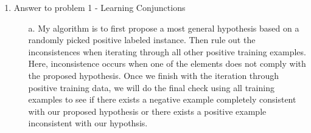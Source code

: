 

\oddsidemargin 0in
\evensidemargin 0in
\textwidth 6.5in
\topmargin -0.5in
\textheight 9.0in

\usepackage{csquotes}
\usepackage{amsmath}
\usepackage[colorlinks]{hyperref}
\usepackage{graphicx}
\graphicspath{{images/}}




\pagestyle{myheadings}  %

\begin{enumerate}
\item Answer to problem 1 - Learning Conjunctions

	\begin{enumerate}\parindent -4pt
	
	\item [a.]
	My algorithm is to first propose a most general hypothesis based on a randomly picked positive labeled instance. Then rule out the inconsistences when iterating through all other positive training examples. Here, inconsistence occurs when one of the elements does not comply with the proposed hypothesis. Once we finish with the iteration through positive training data, we will do the final check using all training examples to see if there exists a negative example completely consistent with our proposed hypothesis or there exists a positive example inconsistent with our hypothsis.


\end{enumerate}
\end{enumerate}

